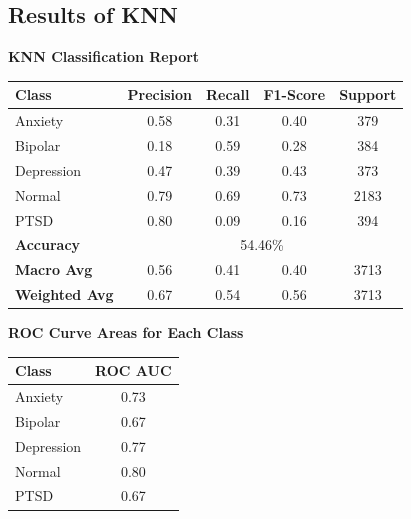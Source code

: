 \pagebreak


\subsection{Results of KNN}

\begin{center}
    \textbf{KNN Classification Report} \\[0.5em]
    \begin{tabular}{|l|c|c|c|c|}
        \hline
        \textbf{Class} & \textbf{Precision} & \textbf{Recall} & \textbf{F1-Score} & \textbf{Support} \\ \hline
        Anxiety        & 0.58               & 0.31            & 0.40              & 379              \\ \hline
        Bipolar        & 0.18               & 0.59            & 0.28              & 384              \\ \hline
        Depression     & 0.47               & 0.39            & 0.43              & 373              \\ \hline
        Normal         & 0.79               & 0.69            & 0.73              & 2183             \\ \hline
        PTSD           & 0.80               & 0.09            & 0.16              & 394              \\ \hline
        \textbf{Accuracy} & \multicolumn{4}{|c|}{54.46\%} \\ \hline
        \textbf{Macro Avg} & 0.56            & 0.41            & 0.40              & 3713             \\ \hline
        \textbf{Weighted Avg} & 0.67         & 0.54            & 0.56              & 3713             \\ \hline
    \end{tabular}
\end{center}

\vspace{0.25em}

\begin{center}
    \textbf{ROC Curve Areas for Each Class} \\[0.5em]
    \begin{tabular}{|l|c|}
        \hline
        \textbf{Class}  & \textbf{ROC AUC} \\ \hline
        Anxiety         & 0.73            \\ \hline
        Bipolar         & 0.67            \\ \hline
        Depression      & 0.77            \\ \hline
        Normal          & 0.80            \\ \hline
        PTSD            & 0.67            \\ \hline
    \end{tabular}
\end{center}

